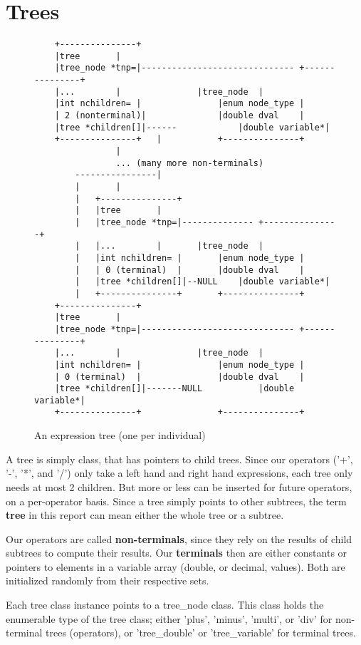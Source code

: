 \documentclass[12pt]{article}
\begin{document}
\section{Trees}
\label{sec:trees}
\begin{figure}[!h]
        \begin{center}
		\scriptsize
		\begin{lstlisting}
	+---------------+
	|tree		|
	|tree_node *tnp=|------------------------------ +---------------+
	|...		|				|tree_node	|
	|int nchildren= |				|enum node_type	|
	| 2 (nonterminal)|				|double dval	|
	|tree *children[]|------			|double variable*|
	+---------------+	|			+---------------+
				|
				... (many more non-terminals)
		----------------|
		|		|
		|	+---------------+
		|	|tree		|
		|	|tree_node *tnp=|-------------- +---------------+
		|	|...		|		|tree_node	|
		|	|int nchildren= |		|enum node_type	|
		|	| 0 (terminal)	|		|double dval	|
		|	|tree *children[]|--NULL	|double variable*|
		|	+---------------+		+---------------+
	+---------------+
	|tree		|
	|tree_node *tnp=|------------------------------ +---------------+
	|...		|				|tree_node	|
	|int nchildren= |				|enum node_type	|
	| 0 (terminal)	|				|double dval	|
	|tree *children[]|-------NULL			|double variable*|
	+---------------+				+---------------+
		\end{lstlisting}
		\normalsize
               \caption{An expression tree (one per individual)}
                \label{tree_rep}
        \end{center}
\end{figure}

A tree is simply class, that has pointers to child trees. Since our operators ('+', '-', '*', and '/') only take a left hand and right hand expressions, each tree only needs at most 2 children. But more or less can be inserted for future operators, on a per-operator basis. Since a tree simply points to other subtrees, the term \textbf{tree} in this report can mean either the whole tree or a subtree.

Our operators are called \textbf{non-terminals}, since they rely on the results of child subtrees to compute their results. Our \textbf{terminals} then are either constants or pointers to elements in a variable array (double, or decimal, values). Both are initialized randomly from their respective sets.

Each tree class instance points to a tree\_node class. This class holds the enumerable type of the tree class; either 'plus', 'minus', 'multi', or 'div' for non-terminal trees (operators), or 'tree\_double' or 'tree\_variable' for terminal trees.
\end{document}

